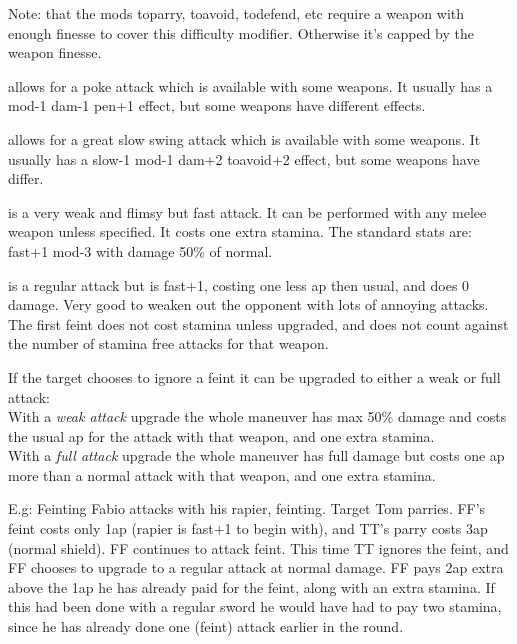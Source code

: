 Note: that the mods toparry, toavoid, todefend, etc require a weapon with enough finesse to cover this difficulty modifier. Otherwise it's capped by the weapon finesse.


\openskillslist


 allows for a poke attack which is available with some weapons. It usually has a mod-1 dam-1 pen+1 effect, but some weapons have different effects.


 allows for a great slow swing attack which is available with some weapons. It usually has a slow-1 mod-1 dam+2 toavoid+2 effect, but some weapons have differ.


 is a very weak and flimsy but fast attack. It can be performed with any melee weapon unless specified. It costs one extra stamina. The standard stats are:\\
fast+1 mod-3 with damage 50\% of normal.


 is a regular attack but is fast+1, costing one less ap then usual, and does 0 damage. Very good to weaken out the opponent with lots of annoying attacks. The first feint does not cost stamina unless upgraded, and does not count against the number of stamina free attacks for that weapon.

If the target chooses to ignore a feint it can be upgraded to either a weak or full attack:\\
With a \emph{weak attack} upgrade the whole maneuver has max 50\% damage and costs the usual ap for the attack with that weapon, and one extra stamina.\\
With a \emph{full attack} upgrade the whole maneuver has full damage but costs one ap more than a normal attack with that weapon, and one extra stamina.

E.g: Feinting Fabio attacks with his rapier, feinting. Target Tom parries. FF's feint costs only 1ap (rapier is fast+1 to begin with), and TT's parry costs 3ap (normal shield). FF continues to attack feint. This time TT ignores the feint, and FF chooses to upgrade to a regular attack at normal damage. FF pays 2ap extra above the 1ap he has already paid for the feint, along with an extra stamina. If this had been done with a regular sword he would have had to pay two stamina, since he has already done one (feint) attack earlier in the round.



